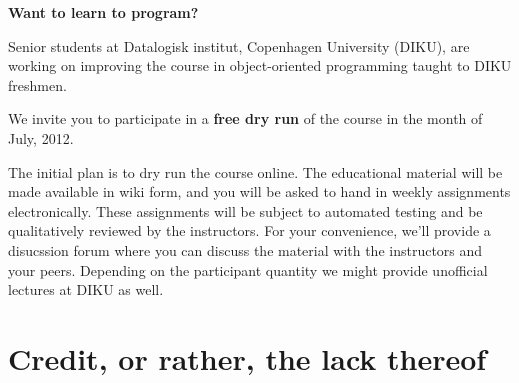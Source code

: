 \setlength{\marginparwidth}{100pt}

\setlength{\marginparsep}{30pt}


\thispagestyle{empty}

\begin{center}

{\Huge \bf Want to learn to program?}

\end{center}

\setlength{\oddsidemargin}{30pt}

\vspace{0.4in}

\large

Senior students at Datalogisk institut, Copenhagen University (DIKU), are
working on improving the course in object-oriented programming taught to DIKU
freshmen.

\vspace{0.2in}



We invite you to participate in a {\bf free dry run} of the course in the month
of July, 2012.

\vspace{0.2in}

The initial plan is to dry run the course online. The educational material will
be made available in wiki form, and you will be asked to hand in weekly
assignments electronically. These assignments will be subject to automated
testing and be qualitatively reviewed by the instructors. For your convenience,
we'll provide a disucssion forum where you can discuss the material with the
instructors and your peers. Depending on the participant quantity we might
provide unofficial lectures at DIKU as well.

\vspace{0.1in}

\setlength{\parindent}{0pt}

\section*{Credit, or rather, the lack thereof}


